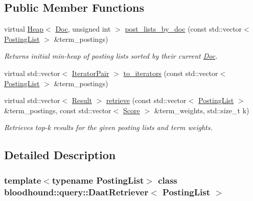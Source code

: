 \subsection*{Public Member Functions}
\begin{DoxyCompactItemize}
\item 
virtual \hyperlink{classbloodhound_1_1Heap}{Heap}$<$ \hyperlink{structbloodhound_1_1Doc}{Doc}, unsigned int $>$ \hyperlink{classbloodhound_1_1query_1_1DaatRetriever_a6ee7e794376c2633089bd13d48b772cf}{post\+\_\+lists\+\_\+by\+\_\+doc} (const std\+::vector$<$ \hyperlink{classbloodhound_1_1PostingList}{Posting\+List} $>$ \&term\+\_\+postings)
\begin{DoxyCompactList}\small\item\em Returns initial min-\/heap of posting lists sorted by their current \hyperlink{structbloodhound_1_1Doc}{Doc}. \end{DoxyCompactList}\item 
virtual std\+::vector$<$ \hyperlink{structbloodhound_1_1query_1_1DaatRetriever_1_1IteratorPair}{Iterator\+Pair} $>$ \hyperlink{classbloodhound_1_1query_1_1DaatRetriever_a5b10288f90a4fc4d89f56971bdc48363}{to\+\_\+iterators} (const std\+::vector$<$ \hyperlink{classbloodhound_1_1PostingList}{Posting\+List} $>$ \&term\+\_\+postings)
\item 
virtual std\+::vector$<$ \hyperlink{structbloodhound_1_1query_1_1Result}{Result} $>$ \hyperlink{classbloodhound_1_1query_1_1DaatRetriever_ab80b4867fc263827dc2fdbe0965a2e8c}{retrieve} (const std\+::vector$<$ \hyperlink{classbloodhound_1_1PostingList}{Posting\+List} $>$ \&term\+\_\+postings, const std\+::vector$<$ \hyperlink{structbloodhound_1_1Score}{Score} $>$ \&term\+\_\+weights, std\+::size\+\_\+t k)
\begin{DoxyCompactList}\small\item\em Retrieves top-\/k results for the given posting lists and term weights. \end{DoxyCompactList}\end{DoxyCompactItemize}


\subsection{Detailed Description}
\subsubsection*{template$<$typename Posting\+List$>$\newline
class bloodhound\+::query\+::\+Daat\+Retriever$<$ Posting\+List $>$}

